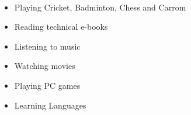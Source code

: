  \\[-0.4cm]
\begin{itemize}
	\item Playing Cricket, Badminton, Chess and Carrom \\[-0.6cm]
	\item Reading technical e-books \\[-0.6cm]
	\item Listening to music \\[-0.6cm]
	\item Watching movies \\[-0.6cm]
	\item Playing PC games \\[-0.6cm]
	\item Learning Languages \\[-0.6cm]
\end{itemize}
